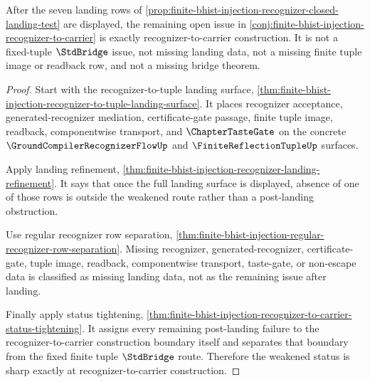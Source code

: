 \begin{theorem}
\label{thm:finite-bhist-injection-recognizer-status-sharpness}
After the seven landing rows of \autoref{prop:finite-bhist-injection-recognizer-closed-landing-test} are displayed, the remaining open issue in \autoref{conj:finite-bhist-injection-recognizer-to-carrier} is exactly recognizer-to-carrier construction. It is not a fixed-tuple $\StdBridge$ issue, not missing landing data, not a missing finite tuple image or readback row, and not a missing bridge theorem.
\end{theorem}
\begin{proof}
Start with the recognizer-to-tuple landing surface, \autoref{thm:finite-bhist-injection-recognizer-to-tuple-landing-surface}. It places recognizer acceptance, generated-recognizer mediation, certificate-gate passage, finite tuple image, readback, componentwise transport, and $\ChapterTasteGate$ on the concrete $\GroundCompilerRecognizerFlowUp$ and $\FiniteReflectionTupleUp$ surfaces.

Apply landing refinement, \autoref{thm:finite-bhist-injection-recognizer-landing-refinement}. It says that once the full landing surface is displayed, absence of one of those rows is outside the weakened route rather than a post-landing obstruction.

Use regular recognizer row separation, \autoref{thm:finite-bhist-injection-regular-recognizer-row-separation}. Missing recognizer, generated-recognizer, certificate-gate, tuple image, readback, componentwise transport, taste-gate, or non-escape data is classified as missing landing data, not as the remaining issue after landing.

Finally apply status tightening, \autoref{thm:finite-bhist-injection-recognizer-to-carrier-status-tightening}. It assigns every remaining post-landing failure to the recognizer-to-carrier construction boundary itself and separates that boundary from the fixed finite tuple $\StdBridge$ route. Therefore the weakened status is sharp exactly at recognizer-to-carrier construction.
\end{proof}


